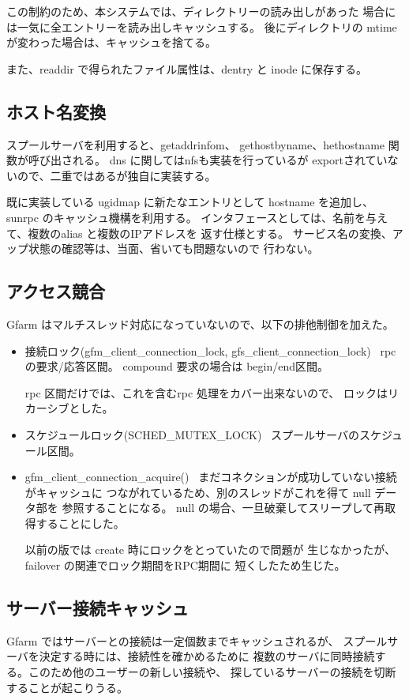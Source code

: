 	この制約のため、本システムでは、ディレクトリーの読み出しがあった
	場合には一気に全エントリーを読み出しキャッシュする。
	後にディレクトリの mtime が変わった場合は、キャッシュを捨てる。

	また、readdir で得られたファイル属性は、dentry と inode に保存する。
	
\subsection{ホスト名変換}
	スプールサーバを利用すると、getaddrinfom、 gethostbyname、hethostname
	関数が呼び出される。 dns に関してはnfsも実装を行っているが
	exportされていないので、二重ではあるが独自に実装する。

	既に実装している ugidmap に新たなエントリとして hostname を追加し、
	sunrpc のキャッシュ機構を利用する。
	インタフェースとしては、名前を与えて、複数のalias と複数のIPアドレスを
	返す仕様とする。
	サービス名の変換、アップ状態の確認等は、当面、省いても問題ないので
	行わない。

\subsection{アクセス競合}

	Gfarm はマルチスレッド対応になっていないので、以下の排他制御を加えた。

	\begin{itemize}
	\item	接続ロック(gfm_client_connection_lock,
				gfs_client_connection_lock)	\
		rpcの要求/応答区間。 compound 要求の場合は begin/end区間。
		
		rpc 区間だけでは、これを含むrpc 処理をカバー出来ないので、
		ロックはリカーシブとした。
	\item	スケジュールロック(SCHED_MUTEX_LOCK)	\
		スプールサーバのスケジュール区間。
	\item	gfm_client_connection_acquire()	\
		まだコネクションが成功していない接続がキャッシュに
		つながれているため、別のスレッドがこれを得て null データ部を
		参照することになる。
		null の場合、一旦破棄してスリープして再取得することにした。

		以前の版では create 時にロックをとっていたので問題が
		生じなかったが、failover の関連でロック期間をRPC期間に
		短くしたため生じた。
	\end{itemize}


\subsection{サーバー接続キャッシュ}
	Gfarm ではサーバーとの接続は一定個数までキャッシュされるが、
	スプールサーバを決定する時には、接続性を確かめるために
	複数のサーバに同時接続する。このため他のユーザーの新しい接続や、
	探しているサーバーの接続を切断することが起こりうる。

